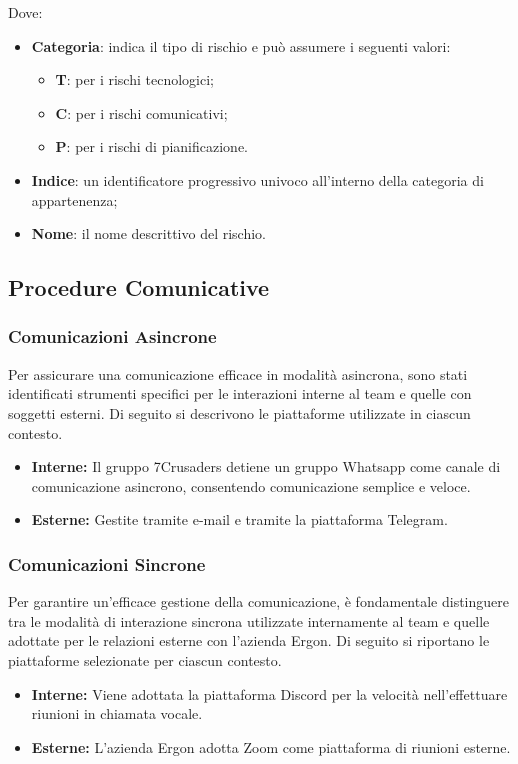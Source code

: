Dove:
\begin{itemize}
    \item \textbf{Categoria}: indica il tipo di rischio e può assumere i seguenti valori:
    \begin{itemize}
        \item \textbf{T}: per i rischi tecnologici;
        \item \textbf{C}: per i rischi comunicativi;
        \item \textbf{P}: per i rischi di pianificazione.
    \end{itemize}
    \item \textbf{Indice}: un identificatore progressivo univoco all'interno della categoria di appartenenza;
    \item \textbf{Nome}: il nome descrittivo del rischio.
\end{itemize}

\subsection{Procedure Comunicative}

\subsubsection{Comunicazioni Asincrone}
Per assicurare una comunicazione efficace in modalità asincrona, sono stati identificati strumenti specifici per le interazioni interne al team e quelle con soggetti esterni. Di seguito si descrivono le piattaforme utilizzate in ciascun contesto.
\begin{itemize}
    \item \textbf{Interne:} Il gruppo 7Crusaders detiene un gruppo Whatsapp come canale di comunicazione asincrono, consentendo comunicazione semplice e veloce.
    \item \textbf{Esterne:} Gestite tramite e-mail e tramite la piattaforma Telegram.
\end{itemize}

\subsubsection{Comunicazioni Sincrone}
Per garantire un'efficace gestione della comunicazione, è fondamentale distinguere tra le modalità di interazione sincrona utilizzate internamente al team e quelle adottate per le relazioni esterne con l'azienda Ergon. Di seguito si riportano le piattaforme selezionate per ciascun contesto.
\begin{itemize}
    \item \textbf{Interne:} Viene adottata la piattaforma Discord per la velocità nell'effettuare riunioni in chiamata vocale.
    \item \textbf{Esterne:} L'azienda Ergon adotta Zoom come piattaforma di riunioni esterne.
\end{itemize}


